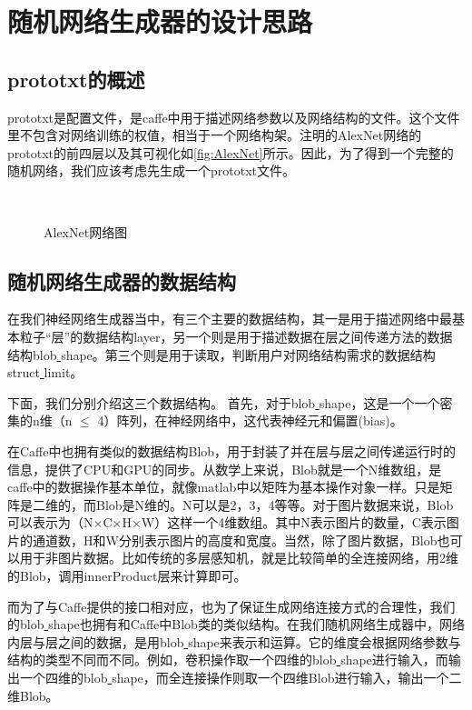 ﻿\chapter{随机网络生成器的设计思路}

\section{prototxt的概述}
prototxt是配置文件，是caffe中用于描述网络参数以及网络结构的文件。这个文件里不包含对网络训练的权值，相当于一个网络构架。注明的AlexNet网络的prototxt的前四层以及其可视化如\autoref{fig:AlexNet}所示。因此，为了得到一个完整的随机网络，我们应该考虑先生成一个prototxt文件。

\begin{figure}[!htbp]
\centering 
{}
\\
\caption{AlexNet网络图}
\label{fig:AlexNet}
\end{figure}

\section{随机网络生成器的数据结构}
在我们神经网络生成器当中，有三个主要的数据结构，其一是用于描述网络中最基本粒子“层”的数据结构layer，另一个则是用于描述数据在层之间传递方法的数据结构blob\underline{ }shape。第三个则是用于读取，判断用户对网络结构需求的数据结构struct\underline{ }limit。

下面，我们分别介绍这三个数据结构。
首先，对于blob\underline{ }shape，这是一个一个密集的n维（n $\leq$ 4）阵列，在神经网络中，这代表神经元和偏置(bias)。

在Caffe中也拥有类似的数据结构Blob，用于封装了并在层与层之间传递运行时的信息，提供了CPU和GPU的同步。从数学上来说，Blob就是一个N维数组，是caffe中的数据操作基本单位，就像matlab中以矩阵为基本操作对象一样。只是矩阵是二维的，而Blob是N维的。N可以是2，3，4等等。对于图片数据来说，Blob可以表示为（N$\times$C$\times$H$\times$W）这样一个4维数组。其中N表示图片的数量，C表示图片的通道数，H和W分别表示图片的高度和宽度。当然，除了图片数据，Blob也可以用于非图片数据。比如传统的多层感知机，就是比较简单的全连接网络，用2维的Blob，调用innerProduct层来计算即可。

而为了与Caffe提供的接口相对应，也为了保证生成网络连接方式的合理性，我们的blob\underline{ }shape也拥有和Caffe中Blob类的类似结构。在我们随机网络生成器中，网络内层与层之间的数据，是用blob\underline{ }shape来表示和运算。它的维度会根据网络参数与结构的类型不同而不同。例如，卷积操作取一个四维的blob\underline{ }shape进行输入，而输出一个四维的blob\underline{ }shape，而全连接操作则取一个四维Blob进行输入，输出一个二维Blob。


